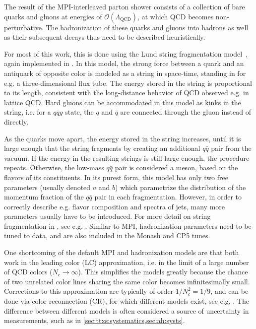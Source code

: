 The result of the MPI-interleaved parton shower consists of a collection of bare quarks and gluons at energies of $\mathcal{O}(\Lambda_{\mathrm{QCD}})$, at which QCD becomes non-perturbative. The hadronization of these quarks and gluons into hadrons as well as their subsequent decays thus need to be described heuristically.

For most of this work, this is done using the Lund string fragmentation model~\cite{Andersson:1983ia,Sjostrand:1984ic}, again implemented in \pythia. In this model, the strong force between a quark and an antiquark of opposite color is modeled as a string in space-time, standing in for e.g. a three-dimensional flux tube. The energy stored in the string is proportional to its length, consistent with the long-distance behavior of QCD observed e.g. in lattice QCD. Hard gluons can be accommodated in this model as kinks in the string, i.e. for a $q\bar{q}g$ state, the $q$ and $\bar{q}$ are connected through the gluon instead of directly.

As the quarks move apart, the energy stored in the string increases, until it is large enough that the string fragments by creating an additional $q\bar{q}$ pair from the vacuum. If the energy in the resulting strings is still large enough, the procedure repeats. Otherwise, the low-mass $q\bar{q}$ pair is considered a meson, based on the flavors of its constituents. In its purest form, this model has only two free parameters (usually denoted $a$ and $b$) which parametrize the distribution of the momentum fraction of the $q\bar{q}$ pair in each fragmentation. However, in order to correctly describe e.g. flavor composition and \pt spectra of jets, many more parameters usually have to be introduced. For more detail on string fragmentation in \pythia, see e.g. . Similar to MPI, hadronization parameters need to be tuned to data, and are also included in the Monash and CP5 tunes.

One shortcoming of the default MPI and hadronization models are that both work in the leading color (LC) approximation, i.e. in the limit of a large number of QCD colors ($N_c \rightarrow \infty$). This simplifies the models greatly because the chance of two unrelated color lines sharing the same color becomes infinitesimally small. Corrections to this approximation are typically of order $1/N_c^2 = 1/9$, and can be done via color reconnection (CR), for which different models exist, see e.g. . The difference between different models is often considered a source of uncertainty in measurements, such as in \cref{sec:ttxs:systematics,sec:ah:systs}.

